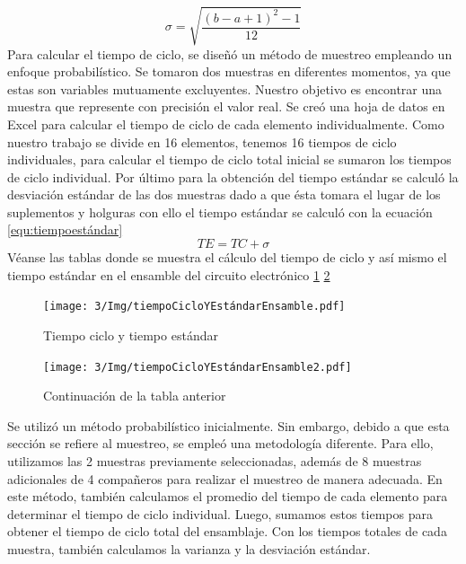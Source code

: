           \begin{equation}
                \label{equ:desviaciónestándar}
                \sigma = \sqrt{\dfrac{(b-a+1)^2-1}{12}}
            \end{equation}
    Para calcular el tiempo de ciclo, se diseñó un método de muestreo empleando un enfoque probabilístico. Se tomaron dos muestras en diferentes momentos, ya que estas son variables mutuamente excluyentes. Nuestro objetivo es encontrar una muestra que represente con precisión el valor real.
    Se creó una hoja de datos en Excel para calcular el tiempo de ciclo de cada elemento individualmente. Como nuestro trabajo se divide en 16 elementos, tenemos 16 tiempos de ciclo individuales, para calcular el tiempo de ciclo total inicial se sumaron los tiempos de ciclo individual. Por último para la
    obtención del tiempo estándar se calculó la desviación estándar de las dos muestras dado a que ésta tomara el lugar de los suplementos y holguras con ello el tiempo estándar se calculó con la ecuación \ref{equ:tiempoestándar}
    \begin{equation}
                \label{equ:tiempoestándar}
               TE= TC + \sigma
            \end{equation}
    Véanse las tablas donde se muestra el cálculo del tiempo de ciclo y así mismo el tiempo estándar en el ensamble del circuito electrónico \ref{fig:tiempoCicloYEstándarEnsamble} \ref{fig:tiempoCicloYEstándarEnsamble2}
    \begin{figure}[H]
        \centering
        \texttt{[image: 3/Img/tiempoCicloYEstándarEnsamble.pdf]}
        \caption{Tiempo ciclo y tiempo estándar} 
        \label{fig:tiempoCicloYEstándarEnsamble}
    \end{figure}
    \begin{figure}[H]
        \centering
        \texttt{[image: 3/Img/tiempoCicloYEstándarEnsamble2.pdf]}
        \caption{Continuación de la tabla anterior} 
        \label{fig:tiempoCicloYEstándarEnsamble2}
    \end{figure}
    Se utilizó un método probabilístico inicialmente. Sin embargo, debido a que esta sección se refiere al muestreo, se empleó una metodología diferente. Para ello, utilizamos las 2 muestras previamente seleccionadas, además de 8 muestras adicionales de 4 compañeros para realizar el muestreo de manera adecuada. En este método, también calculamos el promedio del tiempo de cada elemento para determinar el tiempo de ciclo individual. Luego, sumamos estos tiempos para obtener el tiempo de ciclo total del ensamblaje. Con los tiempos totales de cada muestra, también calculamos la varianza y la desviación estándar.
